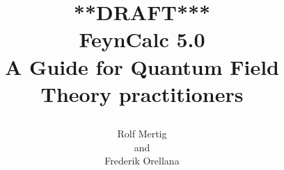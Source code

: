 \documentclass[11pt,a4paper]{report}
\begin{document}
\newcommand{\len}{0pt}
\newcommand{\ind}{\leftskip \len}
\newcommand{\mcode}[1]{
\parbox{0.8\textwidth}{
\setlength{\leftskip}{\len}
\mb{\textbf{ \\ #1 \\ }}
}
}

\renewcommand{\thesection}{\arabic{section}}
\renewcommand{\thechapter}{\arabic{chapter}}

\allsectionsfont{\sffamily}
\subsectionfont{\huge \sffamily}


\newcommand{\fname}[1]{
  $\blacksquare$ \ \ {\large\mb{#1}}
  \begin{quote}
}
\newcommand{\fheading}[1]{
\setlength{\leftskip}{4pt}
}
\newcommand{\fusage}[1]{#1\vspace*{10pt}\newline}
\newcommand{\fnotes}[1]{
\setlength{\parindent}{0pt}
\setlength{\parskip}{0pt}
#1}
\newcommand{\ftabtwo}[1]{
\begin{longtable}[H]{p{0.3\textwidth} p{0.54\textwidth
}}
#1
\end{longtable}
}
\newcommand{\ftabthree}[1]{
\renewcommand{\arraystretch}{0.8}
\renewcommand{\arraycolsep}{0}
\begin{longtable}[H]{p{0.23\textwidth} p{0.1\textwidth} p{0.5\textwidth}}
#1
\end{longtable}
}
\newcommand{\seepage}{}
\newcommand{\ffinish}{\end{quote}}


\title{\raggedright \hspace*{1pt} {\bf ***DRAFT***} \\
\vspace*{12pt}
{\LARGE FeynCalc 5.0}\\
\vspace*{40pt}
{\Large A Guide for Quantum Field Theory practitioners}}
\author{\hspace*{-10pt}
\parbox{\textwidth}{\raggedright Rolf Mertig \\
and \\
Frederik Orellana}}
\date{}
{\sffamily
\maketitle
}
\end{document}
